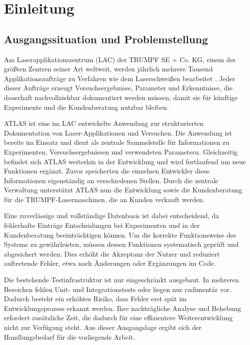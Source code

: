 
\chapter{Einleitung}
\label{chap:einleitung}

\section{Ausgangssituation und Problemstellung}
Am Laserapplikationszentrum (\ac{LAC}) der TRUMPF SE + Co. KG, einem der größten Zentren seiner Art weltweit, werden jährlich mehrere Tausend Applikationsaufträge zu Verfahren wie dem Laserschweißen bearbeitet \autocite{TrumpfLAC2026}. Jeder dieser Aufträge erzeugt Versuchsergebnisse, Parameter und Erkenntnisse, die dauerhaft nachvollziehbar dokumentiert werden müssen, damit sie für künftige Experimente und die Kundenberatung nutzbar bleiben.

\ac{ATLAS} ist eine im \ac{LAC} entwickelte Anwendung zur strukturierten Dokumentation von Laser-Applikationen und Versuchen. Die Anwendung ist bereits im Einsatz und dient als zentrale Sammelstelle für Informationen zu Experimenten, Versuchsergebnissen und verwendeten Parametern. Gleichzeitig befindet sich \ac{ATLAS} weiterhin in der Entwicklung und wird fortlaufend um neue Funktionen ergänzt. Zuvor speicherten die einzelnen Entwickler diese Informationen eigenständig an verschiedenen Stellen. Durch die zentrale Verwaltung unterstützt \ac{ATLAS} nun die Entwicklung sowie die Kundenberatung für die TRUMPF-Lasermaschinen, die an Kunden verkauft werden.

Eine zuverlässige und vollständige Datenbasis ist dabei entscheidend, da fehlerhafte Einträge Entscheidungen bei Experimenten und in der Kundenberatung beeinträchtigen können. Um die korrekte Funktionsweise des Systems zu gewährleisten, müssen dessen Funktionen systematisch geprüft und abgesichert werden. Dies erhöht die Akzeptanz der Nutzer und reduziert auftretende Fehler, etwa nach Änderungen oder Ergänzungen im Code.

Die bestehende Testinfrastruktur ist nur eingeschränkt ausgebaut. In mehreren Bereichen fehlen Unit- und Integrationstests oder liegen nur rudimentär vor. Dadurch besteht ein erhöhtes Risiko, dass Fehler erst spät im Entwicklungsprozess erkannt werden. Ihre nachträgliche Analyse und Behebung erfordert zusätzliche Zeit, die dadurch für eine effizientere Weiterentwicklung nicht zur Verfügung steht. Aus dieser Ausgangslage ergibt sich der Handlungsbedarf für die vorliegende Arbeit.

